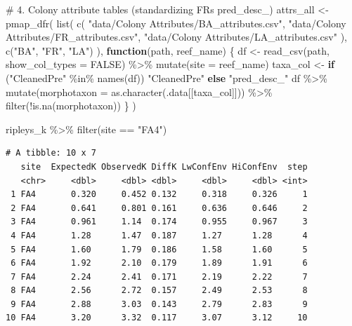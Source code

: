 \documentclass[
  letterpaper,
  DIV=11,
  numbers=noendperiod]{scrartcl}
\newenvironment{Shaded}{\begin{snugshade}}{\end{snugshade}}
\newcommand{\AttributeTok}[1]{\textcolor[rgb]{0.40,0.45,0.13}{#1}}
\newcommand{\CommentTok}[1]{\textcolor[rgb]{0.37,0.37,0.37}{#1}}
\newcommand{\ConstantTok}[1]{\textcolor[rgb]{0.56,0.35,0.01}{#1}}
\newcommand{\ControlFlowTok}[1]{\textcolor[rgb]{0.00,0.23,0.31}{\textbf{#1}}}
\newcommand{\FunctionTok}[1]{\textcolor[rgb]{0.28,0.35,0.67}{#1}}
\newcommand{\NormalTok}[1]{\textcolor[rgb]{0.00,0.23,0.31}{#1}}
\newcommand{\OtherTok}[1]{\textcolor[rgb]{0.00,0.23,0.31}{#1}}
\newcommand{\SpecialCharTok}[1]{\textcolor[rgb]{0.37,0.37,0.37}{#1}}
\newcommand{\StringTok}[1]{\textcolor[rgb]{0.13,0.47,0.30}{#1}}
\begin{document}
\begin{Shaded}
\begin{Highlighting}[]
\CommentTok{\# 4. Colony attribute tables (standardizing FR\textquotesingle{}s pred\_desc\_)}
\NormalTok{attrs\_all }\OtherTok{\textless{}{-}} \FunctionTok{pmap\_dfr}\NormalTok{(}
  \FunctionTok{list}\NormalTok{(}
    \FunctionTok{c}\NormalTok{(}
      \StringTok{"data/Colony Attributes/BA\_attributes.csv"}\NormalTok{,}
      \StringTok{"data/Colony Attributes/FR\_attributes.csv"}\NormalTok{,}
      \StringTok{"data/Colony Attributes/LA\_attributes.csv"}
\NormalTok{    ),}
    \FunctionTok{c}\NormalTok{(}\StringTok{"BA"}\NormalTok{, }\StringTok{"FR"}\NormalTok{, }\StringTok{"LA"}\NormalTok{)}
\NormalTok{  ),}
  \ControlFlowTok{function}\NormalTok{(path, reef\_name) \{}
\NormalTok{    df }\OtherTok{\textless{}{-}} \FunctionTok{read\_csv}\NormalTok{(path, }\AttributeTok{show\_col\_types =} \ConstantTok{FALSE}\NormalTok{) }\SpecialCharTok{\%\textgreater{}\%}
      \FunctionTok{mutate}\NormalTok{(}\AttributeTok{site =}\NormalTok{ reef\_name)}
\NormalTok{    taxa\_col }\OtherTok{\textless{}{-}} \ControlFlowTok{if}\NormalTok{ (}\StringTok{"CleanedPre"} \SpecialCharTok{\%in\%} \FunctionTok{names}\NormalTok{(df)) }\StringTok{"CleanedPre"} \ControlFlowTok{else} \StringTok{"pred\_desc\_"}
\NormalTok{    df }\SpecialCharTok{\%\textgreater{}\%}
      \FunctionTok{mutate}\NormalTok{(}\AttributeTok{morphotaxon =} \FunctionTok{as.character}\NormalTok{(.data[[taxa\_col]])) }\SpecialCharTok{\%\textgreater{}\%}
      \FunctionTok{filter}\NormalTok{(}\SpecialCharTok{!}\FunctionTok{is.na}\NormalTok{(morphotaxon))}
\NormalTok{  \}}
\NormalTok{)}
\end{Highlighting}
\end{Shaded}

\begin{Shaded}
\begin{Highlighting}[]
\NormalTok{ripleys\_k }\SpecialCharTok{\%\textgreater{}\%} \FunctionTok{filter}\NormalTok{(site }\SpecialCharTok{==} \StringTok{"FA4"}\NormalTok{)}
\end{Highlighting}
\end{Shaded}

\begin{verbatim}
# A tibble: 10 x 7
   site  ExpectedK ObservedK DiffK LwConfEnv HiConfEnv  step
   <chr>     <dbl>     <dbl> <dbl>     <dbl>     <dbl> <int>
 1 FA4       0.320     0.452 0.132     0.318     0.326     1
 2 FA4       0.641     0.801 0.161     0.636     0.646     2
 3 FA4       0.961     1.14  0.174     0.955     0.967     3
 4 FA4       1.28      1.47  0.187     1.27      1.28      4
 5 FA4       1.60      1.79  0.186     1.58      1.60      5
 6 FA4       1.92      2.10  0.179     1.89      1.91      6
 7 FA4       2.24      2.41  0.171     2.19      2.22      7
 8 FA4       2.56      2.72  0.157     2.49      2.53      8
 9 FA4       2.88      3.03  0.143     2.79      2.83      9
10 FA4       3.20      3.32  0.117     3.07      3.12     10
\end{verbatim}
\end{document}
